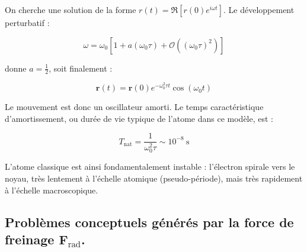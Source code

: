 \documentclass[a4paper,10pt]{report}
\begin{document}
\begin{enumerate}
		On cherche une solution de la forme $r(t) = \Re \left[ r(0) e^{i \omega t} \right]$. Le développement perturbatif :
		
		\begin{equation}
			\omega = \omega_0 \left[1 + a (\omega_0 \tau) + \mathcal{O}((\omega_0 \tau)^2)\right] \tag{4.13.7}
		\end{equation}
		
		donne $a = \frac{1}{2}$, soit finalement :
		
		\begin{equation}
			\textbf{r}(t) = \textbf{r}(0) e^{- \omega_0^2 \tau t} \cos(\omega_0 t) \tag{4.13.8}
		\end{equation}
		
		Le mouvement est donc un oscillateur amorti. Le temps caractéristique d’amortissement, ou durée de vie typique de l’atome dans ce modèle, est :
		
		\begin{equation}
			T_{\text{nat}} = \frac{1}{\omega_0^2 \tau} \sim 10^{-8}~\text{s} \tag{4.13.9}
		\end{equation}
		
		L'atome classique est ainsi fondamentalement instable : l’électron spirale vers le noyau, très lentement à l’échelle atomique (pseudo-période), mais très rapidement à l’échelle macroscopique.
		
\end{enumerate}	
	
\subsection{Problèmes conceptuels générés par la force de freinage $\textbf{F}_\text{rad}$.}
\end{document}
